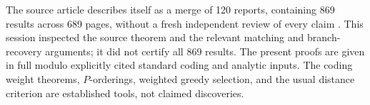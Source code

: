 The source article describes itself as a merge of 120 reports, containing
869 results across 689 pages, without a fresh independent review of every
claim \cite{article}. This session inspected the source theorem and the
relevant matching and branch-recovery arguments; it did not certify all
869 results. The present proofs are given in full modulo explicitly cited
standard coding and analytic inputs. The coding weight theorems,
$P$-orderings, weighted greedy selection, and the usual distance criterion
are established tools, not claimed discoveries.
